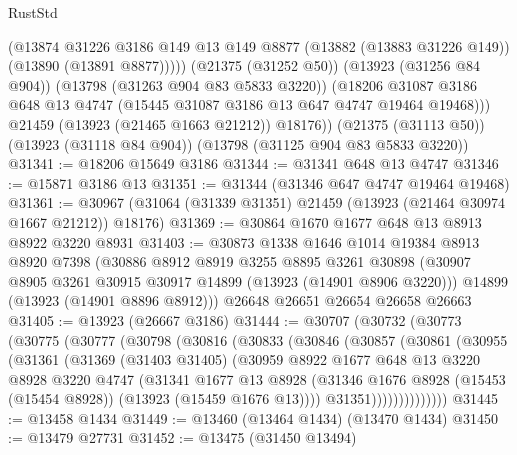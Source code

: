 \begin{lexlean}{RustStd}
\begin{coremodule}
              (@13874
                @31226
                @3186
                @149
                @13
                @149
                @8877
                (@13882 (@13883 @31226 @149))
                (@13890 (@13891 @8877)))))
          (@21375 (@31252 @50))
          (@13923 (@31256 @84 @904))
          (@13798 (@31263 @904 @83 @5833 @3220))
          (@18206 @31087 @3186 @648 @13 @4747 (@15445 @31087 @3186 @13 @647 @4747 @19464 @19468)))
        @21459
        (@13923 (@21465 @1663 @21212))
        @18176))
    (@21375 (@31113 @50))
    (@13923 (@31118 @84 @904))
    (@13798 (@31125 @904 @83 @5833 @3220))
@31341 := @18206 @15649 @3186
@31344 := @31341 @648 @13 @4747
@31346 := @15871 @3186 @13
@31351 := @31344 (@31346 @647 @4747 @19464 @19468)
@31361 := @30967 (@31064 (@31339 @31351) @21459 (@13923 (@21464 @30974 @1667 @21212)) @18176)
@31369 := @30864 @1670 @1677 @648 @13 @8913 @8922 @3220 @8931
@31403 := @30873
    @1338
    @1646
    @1014
    @19384
    @8913
    @8920
    @7398
    (@30886
      @8912
      @8919
      @3255
      @8895
      @3261
      @30898
      (@30907 @8905 @3261 @30915 @30917 @14899 (@13923 (@14901 @8906 @3220)))
      @14899
      (@13923 (@14901 @8896 @8912)))
    @26648
    @26651
    @26654
    @26658
    @26663
@31405 := @13923 (@26667 @3186)
@31444 := @30707
    (@30732
      (@30773
        (@30775
          (@30777
            (@30798
              (@30816
                (@30833
                  (@30846
                    (@30857
                      (@30861
                        (@30955
                          (@31361
                            (@31369
                              (@31403 @31405)
                              (@30959
                                @8922
                                @1677
                                @648
                                @13
                                @3220
                                @8928
                                @3220
                                @4747
                                (@31341
                                  @1677
                                  @13
                                  @8928
                                  (@31346
                                    @1676
                                    @8928
                                    (@15453 (@15454 @8928))
                                    (@13923 (@15459 @1676 @13))))
                                @31351))))))))))))))
@31445 := @13458 @1434
@31449 := @13460 (@13464 @1434) (@13470 @1434)
@31450 := @13479 @27731
@31452 := @13475 (@31450 @13494)

\end{coremodule}
\end{lexlean}
